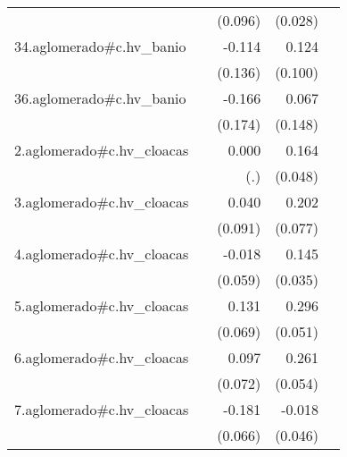 {\begin{longtable}{l*{4}{D{.}{.}{-1}}}
            &                     &     (0.096)         &     (0.028)         &                     \\
\addlinespace
34.aglomerado#c.hv\_banio&                     &      -0.114         &       0.124         &                     \\
            &                     &     (0.136)         &     (0.100)         &                     \\
\addlinespace
36.aglomerado#c.hv\_banio&                     &      -0.166         &       0.067         &                     \\
            &                     &     (0.174)         &     (0.148)         &                     \\
\addlinespace
2.aglomerado#c.hv\_cloacas&                     &       0.000         &       0.164\sym{***}&                     \\
            &                     &         (.)         &     (0.048)         &                     \\
\addlinespace
3.aglomerado#c.hv\_cloacas&                     &       0.040         &       0.202\sym{**} &                     \\
            &                     &     (0.091)         &     (0.077)         &                     \\
\addlinespace
4.aglomerado#c.hv\_cloacas&                     &      -0.018         &       0.145\sym{***}&                     \\
            &                     &     (0.059)         &     (0.035)         &                     \\
\addlinespace
5.aglomerado#c.hv\_cloacas&                     &       0.131         &       0.296\sym{***}&                     \\
            &                     &     (0.069)         &     (0.051)         &                     \\
\addlinespace
6.aglomerado#c.hv\_cloacas&                     &       0.097         &       0.261\sym{***}&                     \\
            &                     &     (0.072)         &     (0.054)         &                     \\
\addlinespace
7.aglomerado#c.hv\_cloacas&                     &      -0.181\sym{**} &      -0.018         &                     \\
            &                     &     (0.066)         &     (0.046)         &                     \\

\end{longtable}}
